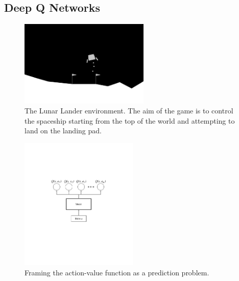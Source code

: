 \documentclass[xcolor={table}]{beamer}
\begin{document}
\subsection{Deep Q Networks}



 \begin{frame} 
\begin{figure}[tbh]
\begin{center}
\includegraphics[width=0.55\textwidth]{./images/fmlpda_figure_11_7.jpg} 
\end{center}
\caption{The Lunar Lander environment. The aim of the game is to control the spaceship starting from the top of the world and attempting to land on the landing pad.}
\label{fig:rl_lunar_lander_env}
\end{figure}
\end{frame} 



 \begin{frame} 
\begin{figure}[tbh]
\begin{center}
\includegraphics[width=0.5\textwidth]{./images/fmlpda_figure_11_8.pdf}
\end{center}
\caption{Framing the action-value function as a prediction problem.}
\label{fig:rl_dqn_architecture}
\end{figure}
\end{frame} 
\end{document}
